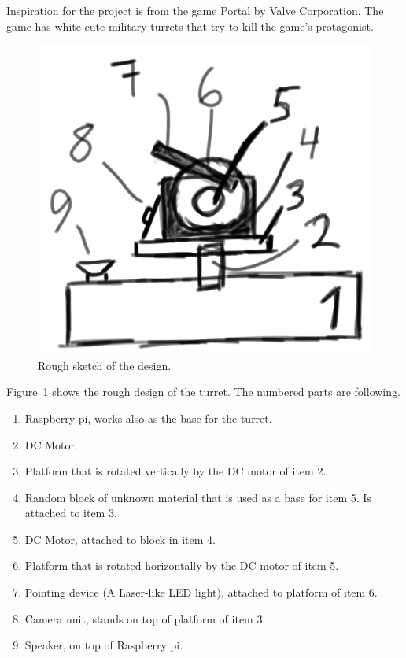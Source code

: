 \documentclass[english,11pt,twoside,a4paper]{article}
\begin{document}
Inspiration for the project is from the game Portal by Valve Corporation. The game has white cute military turrets that try to kill the game's protagonist.

\begin{figure}
  \begin{center}
    \includegraphics[scale=0.15]{design_sketch.png}
    \caption{Rough sketch of the design.}
  \end{center}
  \label{sketch}
\end{figure}

Figure~\ref{sketch} shows the rough design of the turret. The numbered parts are following.

\begin{enumerate}
  \item Raspberry pi, works also as the base for the turret.
  \item DC Motor.
  \item Platform that is rotated vertically by the DC motor of item 2.
  \item Random block of unknown material that is used as a base for item 5. Is attached to item 3.
  \item DC Motor, attached to block in item 4.
  \item Platform that is rotated horizontally by the DC motor of item 5.
  \item Pointing device (A Laser-like LED light), attached to platform of item 6.
  \item Camera unit, stands on top of platform of item 3.
  \item Speaker, on top of Raspberry pi.
\end{enumerate}
\end{document}

